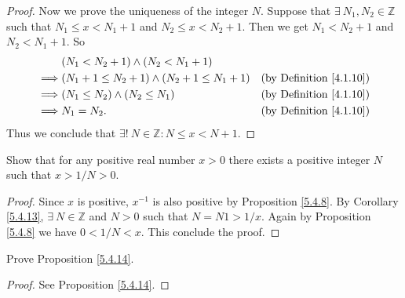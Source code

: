 \begin{proof}
Now we prove the uniqueness of the integer \(N\).
Suppose that \(\exists\ N_1, N_2 \in \mathds{Z}\) such that \(N_1 \leq x < N_1 + 1\) and \(N_2 \leq x < N_2 + 1\).
Then we get \(N_1 < N_2 + 1\) and \(N_2 < N_1 + 1\).
So
\begin{align*}
& (N_1 < N_2 + 1) \land (N_2 < N_1 + 1) \\
\implies & (N_1 + 1 \leq N_2 + 1) \land (N_2 + 1 \leq N_1 + 1) & \text{(by Definition \ref{4.1.10})} \\
\implies & (N_1 \leq N_2) \land (N_2 \leq N_1) & \text{(by Definition \ref{4.1.10})} \\
\implies & N_1 = N_2. & \text{(by Definition \ref{4.1.10})}
\end{align*}
Thus we conclude that \(\exists!\ N \in \mathds{Z} : N \leq x < N + 1\).
\end{proof}

\begin{exercise}\label{ex 5.4.4}
Show that for any positive real number \(x > 0\) there exists a positive integer \(N\) such that \(x > 1 / N > 0\).
\end{exercise}

\begin{proof}
Since \(x\) is positive, \(x^{-1}\) is also positive by Proposition \ref{5.4.8}.
By Corollary \ref{5.4.13}, \(\exists\ N \in \mathds{Z}\) and \(N > 0\) such that \(N = N1 > 1 / x\).
Again by Proposition \ref{5.4.8} we have \(0 < 1 / N < x\).
This conclude the proof.
\end{proof}

\begin{exercise}\label{ex 5.4.5}
Prove Proposition \ref{5.4.14}.
\end{exercise}

\begin{proof}
See Proposition \ref{5.4.14}.
\end{proof}